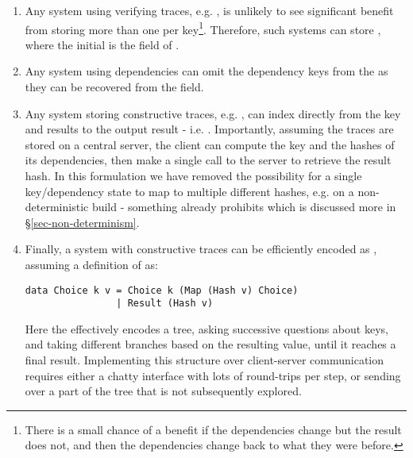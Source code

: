 \begin{enumerate}
\item Any system using verifying traces, e.g. \Shake, is unlikely to see significant benefit from storing more than one  per key\footnote{There is a small chance of a benefit if the dependencies change but the result does not, and then the dependencies change back to what they were before.}. Therefore, such systems can store , where the initial  is the  field of .
\item Any system using  dependencies can omit the dependency keys from the  as they can be recovered from the  field.
\item Any  system storing constructive traces, e.g. \Bazel, can index directly from the key and results to the output result - i.e. . Importantly, assuming the traces are stored on a central server, the client can compute the key and the hashes of its dependencies, then make a single call to the server to retrieve the result hash. In this formulation we have removed the possibility for a single key/dependency state to map to multiple different hashes, e.g. on a non-deterministic build - something \Bazel already prohibits which is discussed more in \S\ref{sec-non-determinism}.
\item Finally, a  system with constructive traces can be efficiently encoded as , assuming a definition of  as:
\begin{verbatim}
data Choice k v = Choice k (Map (Hash v) Choice)
                | Result (Hash v)
\end{verbatim}
Here the  effectively encodes a tree, asking successive questions about keys, and taking different branches based on the resulting value, until it reaches a final result. Implementing this structure over client-server communication requires either a chatty interface with lots of round-trips per  step, or sending over a part of the tree that is not subsequently explored.
\end{enumerate}
